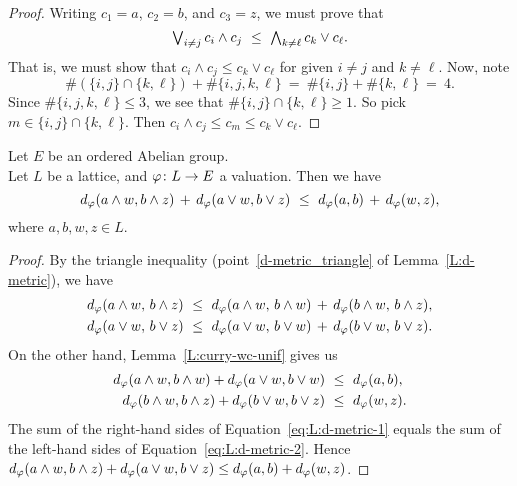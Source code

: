 \documentclass[main.tex]{subfiles}
\begin{document}
\begin{proof}
Writing $c_1 = a$, $c_2 = b$, and $c_3 = z$,
we must prove that 
\begin{equation*}
\textstyle{\bigvee}_{i\neq j}\, c_i \wedge c_j \ \leq\ \textstyle{\bigwedge}_{k\neq \ell}\, c_k \vee c_\ell.
\end{equation*}
That is,
we must show that 
$c_i \wedge c_j \leq c_k \vee c_\ell$
for given $i\neq j$ and $k\neq \ell$.
Now, note
\begin{equation*}
\# (\{ i,j \} \cap \{ k,\ell\}) + \#\{i,j,k,\ell\}
\ = \ \# \{i,j\} + \# \{k,\ell \}
\ = \ 4.
\end{equation*}
Since  $\# \{ i,j,k,\ell \}\leq 3$,
we see that $\# \{ i,j \} \cap \{ k,\ell\} \geq 1$.
So pick $m\in  \{ i,j \} \cap \{ k,\ell\}$.
Then $c_i \wedge c_j \leq c_m \leq c_k \vee c_\ell$.
\end{proof}
%
%
\begin{lem}
\label{L:wv-unif}
Let $E$ be an ordered Abelian group.\\
Let $L$ be a lattice,
and $\varphi\colon L \rightarrow E$ a valuation.
Then we have
\begin{equation*}
\ld\varphi(a\wedge w,b\wedge z) \,+\, \ld\varphi(a \vee w,b\vee z)
\ \leq\ 
\ld\varphi(a,b) \,+\, \ld\varphi(w,z),
\end{equation*}
where $a,b,w,z\in L$.
\end{lem}
\begin{proof}
By the triangle inequality (point~\ref{d-metric_triangle}
of Lemma~\ref{L:d-metric}),
we have
\begin{equation}
\label{eq:L:d-metric-1}
\begin{alignedat}{3}
\ld\varphi(a\wedge w,\,b\wedge z)\ &\leq\ 
\ld\varphi(a\wedge w,\,b\wedge w)\,+\,
\ld\varphi(b\wedge w,\,b\wedge z), \\
\ld\varphi(a\vee w,\,b\vee z)\ &\leq\ 
\ld\varphi(a\vee w,\,b\vee w)\,+\,
\ld\varphi(b\vee w,\,b\vee z).
\end{alignedat}
\end{equation}
On the other hand, Lemma~\ref{L:curry-wc-unif} gives us
\begin{equation}
\label{eq:L:d-metric-2}
\begin{alignedat}{3}
d_{\smash{\varphi}}(a\wedge w,b\wedge w) + d_{\smash{\varphi}}(a\vee w,b\vee w)
   \ &\leq\ d_{\smash{\varphi}}(a,b), \\
d_{\smash{\varphi}}(b\wedge w,b\wedge z) + d_{\smash{\varphi}}(b\vee w, b\vee z)
   \ &\leq\ d_{\smash{\varphi}}(w,z).
\end{alignedat}
\end{equation}
The sum of the right-hand sides of Equation~\eqref{eq:L:d-metric-1}
equals the sum of the left-hand sides of Equation~\eqref{eq:L:d-metric-2}.
Hence
$d_{\smash{\varphi}}(a\wedge w,b\wedge z) + d_{\smash{\varphi}}(a \vee w,b\vee z)
\leq 
d_{\smash{\varphi}}(a,b) + d_{\smash{\varphi}}(w,z)$.
\end{proof}
%
%
\end{document}
